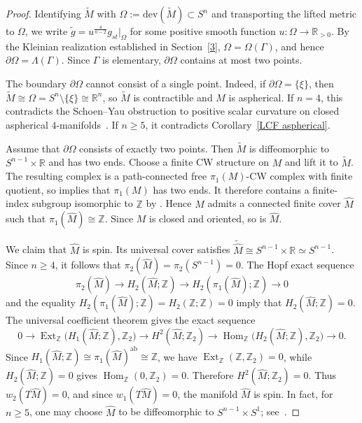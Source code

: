 \documentclass[12pt,oneside,a4paper]{article}
\theoremstyle{mytheorem}
\theoremstyle{remark}
\theoremstyle{definition}
\begin{document}
\begin{proof}

 Identifying \(\widetilde{M}\) with
$\Omega:=\mathrm{dev}(\widetilde{M})\subset S^n$ and transporting the
lifted metric to $\Omega$, we write
\(\tilde g=u^{\frac{4}{n-2}}g_{st}\big|_{\Omega}\)
for some positive smooth function \(u\colon\Omega\to\mathbb R_{>0}\).
By the Kleinian realization established in Section~\ref{3},
\(\Omega=\Omega(\Gamma)\), and hence
\(\partial\Omega=\Lambda(\Gamma)\). Since \(\Gamma\) is elementary,
\(\partial\Omega\) contains at most two points.

The boundary $\partial\Omega$ cannot consist of a single point. Indeed,
if \(\partial\Omega=\{\xi\}\), then
\(\widetilde M\cong\Omega=S^n\setminus\{\xi\}\cong\mathbb R^n\),
so \(\widetilde M\) is contractible and \(M\) is aspherical. If $n=4$,
this contradicts the Schoen--Yau obstruction to positive scalar curvature
on closed aspherical $4$-manifolds~\cite[Theorem~6]{zbMATH04075990}. If
$n\geq5$, it contradicts Corollary~\ref{LCF aspherical}.

Assume that \( \partial \Omega \) consists of exactly two points. Then
\(\widetilde M\) is diffeomorphic to \(S^{n-1}\times\mathbb R\) and
has two ends. Choose a finite CW structure on $M$ and lift it to
$\widetilde M$. The resulting complex is a path-connected free
$\pi_1(M)$-CW complex with finite quotient, so
\cite[Corollary~13.5.12]{zbMATH05189637} implies that $\pi_1(M)$ has two
ends. It therefore contains a finite-index subgroup isomorphic to
$\mathbb Z$ by \cite[Theorem~13.5.9]{zbMATH05189637}. Hence $M$ admits a
connected finite cover
\(\widehat M\) such that
\(\pi_1(\widehat M)\cong\mathbb Z\). Since \(M\) is closed and
oriented, so is \(\widehat M\).

We claim that \(\widehat M\) is spin. Its universal cover satisfies
\(\widetilde{\widehat M}\cong S^{n-1}\times\mathbb R\simeq S^{n-1}\).
Since \(n\geq4\), it follows that
\(\pi_2(\widehat M)=\pi_2(S^{n-1})=0\). The Hopf exact sequence
\[
\pi_2(\widehat M)\longrightarrow H_2(\widehat M;\mathbb Z)
\longrightarrow H_2(\pi_1(\widehat M);\mathbb Z)\longrightarrow0
\]
and the equality
\(H_2(\pi_1(\widehat M);\mathbb Z)
=H_2(\mathbb Z;\mathbb Z)=0\) imply that
\(H_2(\widehat M;\mathbb Z)=0\). The universal coefficient theorem
gives the exact sequence
\[
0\longrightarrow
\operatorname{Ext}_{\mathbb Z}
\bigl(H_1(\widehat M;\mathbb Z),\mathbb Z_2\bigr)
\longrightarrow H^2(\widehat M;\mathbb Z_2)
\longrightarrow
\operatorname{Hom}_{\mathbb Z}
\bigl(H_2(\widehat M;\mathbb Z),\mathbb Z_2\bigr)
\longrightarrow0.
\]
Since
\(H_1(\widehat M;\mathbb Z)
\cong\pi_1(\widehat M)^{\mathrm{ab}}
\cong\mathbb Z\),
we have
\(\operatorname{Ext}_{\mathbb Z}(\mathbb Z,\mathbb Z_2)=0\), while
\(H_2(\widehat M;\mathbb Z)=0\) gives
\(\operatorname{Hom}_{\mathbb Z}(0,\mathbb Z_2)=0\). Therefore
\(
H^2(\widehat M;\mathbb Z_2)=0.
\)
Thus \(w_2(T\widehat M)=0\), and since
\(w_1(T\widehat M)=0\), the manifold \(\widehat M\) is spin. In fact,
for \(n\geq5\), one may choose \(\widehat M\) to be diffeomorphic to
\(S^{n-1}\times S^1\); see~\cite{504170}.


\end{proof}
\end{document}

